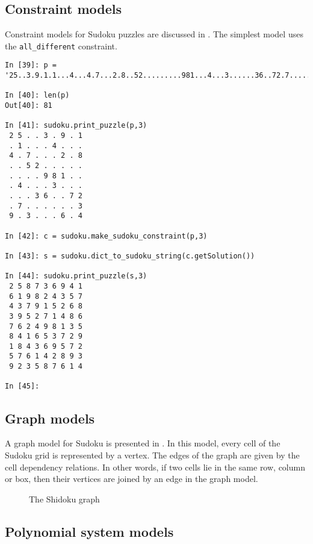\subsection{Constraint models}
\label{sec:models:constraints}

Constraint models for Sudoku puzzles are discussed in \cite{simonissudoku}. The simplest model uses the \verb!all_different! constraint.

\begin{lstlisting}[frame=tb,float,caption=Solving a Sudoku via constraint model]
In [39]: p = '25..3.9.1.1...4...4.7...2.8..52.........981...4...3......36..72.7......39.3...6.4'

In [40]: len(p)
Out[40]: 81

In [41]: sudoku.print_puzzle(p,3)
 2 5 . . 3 . 9 . 1 
 . 1 . . . 4 . . . 
 4 . 7 . . . 2 . 8 
 . . 5 2 . . . . . 
 . . . . 9 8 1 . . 
 . 4 . . . 3 . . . 
 . . . 3 6 . . 7 2 
 . 7 . . . . . . 3 
 9 . 3 . . . 6 . 4 

In [42]: c = sudoku.make_sudoku_constraint(p,3)

In [43]: s = sudoku.dict_to_sudoku_string(c.getSolution())

In [44]: sudoku.print_puzzle(s,3)
 2 5 8 7 3 6 9 4 1 
 6 1 9 8 2 4 3 5 7 
 4 3 7 9 1 5 2 6 8 
 3 9 5 2 7 1 4 8 6 
 7 6 2 4 9 8 1 3 5 
 8 4 1 6 5 3 7 2 9 
 1 8 4 3 6 9 5 7 2 
 5 7 6 1 4 2 8 9 3 
 9 2 3 5 8 7 6 1 4 

In [45]: 
\end{lstlisting}

\subsection{Graph models}
\label{sec:models:graph}

A graph model for Sudoku is presented in \cite{gagovargaset}. In this model, every cell of the Sudoku grid is represented by a vertex. The edges of the graph are given by the cell dependency relations. In other words, if two cells lie in the same row, column or box, then their vertices are joined by an edge in the graph model.

\begin{figure}[h]
\centering
\begin{dot2tex}[circo,mathmode,options={--graphstyle "scale=0.40"}]
  
\end{dot2tex}
\caption{The Shidoku graph}
\end{figure}

\subsection{Polynomial system models}
\label{sec:models:polynomials}


